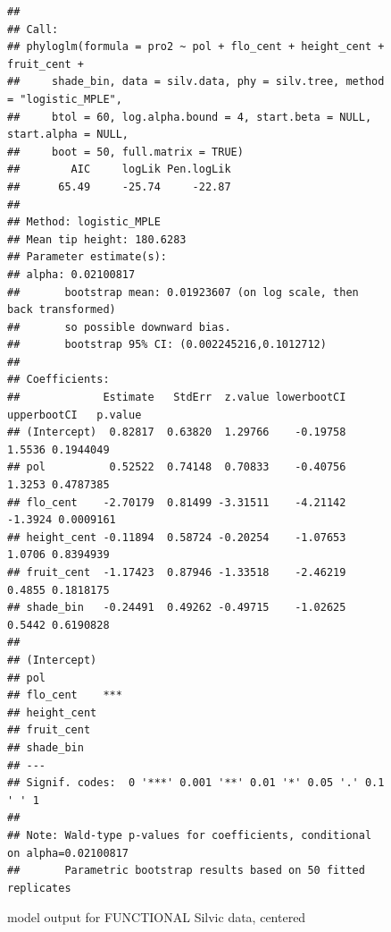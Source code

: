 \documentclass{article}\usepackage[]{graphicx}\usepackage[]{color}
\makeatletter
\newenvironment{kframe}{%
 \def\at@end@of@kframe{}%
 \ifinner\ifhmode%
  \def\at@end@of@kframe{\end{minipage}}%
  \begin{minipage}{\columnwidth}%
 \fi\fi%
 \def\FrameCommand##1{\hskip\@totalleftmargin \hskip-\fboxsep
 \colorbox{shadecolor}{##1}\hskip-\fboxsep
     \hskip-\linewidth \hskip-\@totalleftmargin \hskip\columnwidth}%
 \MakeFramed {\advance\hsize-\width
   \@totalleftmargin\z@ \linewidth\hsize
   \@setminipage}}%
 {\par\unskip\endMakeFramed%
 \at@end@of@kframe}
\newenvironment{knitrout}{}{} %
\makeatother
\begin{document}
\begin{figure}[h!]
\begin{knitrout}
\color{fgcolor}\begin{kframe}
\begin{verbatim}
## 
## Call:
## phyloglm(formula = pro2 ~ pol + flo_cent + height_cent + fruit_cent + 
##     shade_bin, data = silv.data, phy = silv.tree, method = "logistic_MPLE", 
##     btol = 60, log.alpha.bound = 4, start.beta = NULL, start.alpha = NULL, 
##     boot = 50, full.matrix = TRUE)
##        AIC     logLik Pen.logLik 
##      65.49     -25.74     -22.87 
## 
## Method: logistic_MPLE
## Mean tip height: 180.6283
## Parameter estimate(s):
## alpha: 0.02100817 
##       bootstrap mean: 0.01923607 (on log scale, then back transformed)
##       so possible downward bias.
##       bootstrap 95% CI: (0.002245216,0.1012712)
## 
## Coefficients:
##             Estimate   StdErr  z.value lowerbootCI upperbootCI   p.value
## (Intercept)  0.82817  0.63820  1.29766    -0.19758      1.5536 0.1944049
## pol          0.52522  0.74148  0.70833    -0.40756      1.3253 0.4787385
## flo_cent    -2.70179  0.81499 -3.31511    -4.21142     -1.3924 0.0009161
## height_cent -0.11894  0.58724 -0.20254    -1.07653      1.0706 0.8394939
## fruit_cent  -1.17423  0.87946 -1.33518    -2.46219      0.4855 0.1818175
## shade_bin   -0.24491  0.49262 -0.49715    -1.02625      0.5442 0.6190828
##                
## (Intercept)    
## pol            
## flo_cent    ***
## height_cent    
## fruit_cent     
## shade_bin      
## ---
## Signif. codes:  0 '***' 0.001 '**' 0.01 '*' 0.05 '.' 0.1 ' ' 1
## 
## Note: Wald-type p-values for coefficients, conditional on alpha=0.02100817
##       Parametric bootstrap results based on 50 fitted replicates
\end{verbatim}
\end{kframe}
\end{knitrout}
\caption{model output for FUNCTIONAL Silvic data, centered}
\end{figure}
\end{document}
